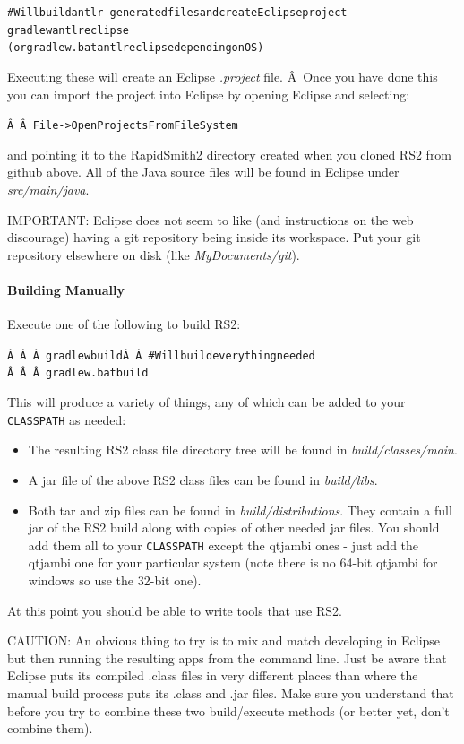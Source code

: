 \documentclass[12pt]{article}
\newcommand{\env}[1]{{\texttt{#1}}}
\newcommand{\fil}[1]{{\em #1}}
\newcommand{\dir}[1]{{\em #1}}
\newenvironment{code}{\begin{center} \begin{minipage}{6in} \noindent \begin{alltt}}{\end{alltt} \end{minipage} \end{center}}
\begin{document}
\vspace{-0.15in}  \begin{code}
# Will build antlr-generated files and create Eclipse project
gradlew antlr eclipse       
(or gradlew.bat antlr eclipse depending on OS)
\end{code} 
Executing these will create an Eclipse \fil{.project} file. Â Once you have done
this you can import the project into Eclipse by opening Eclipse and selecting: 
\vspace{-0.15in}  \begin{code}
Â  Â  File->Open Projects From File System 
\end{code}
and pointing it to the RapidSmith2 directory created when you cloned RS2 from
github above. 
All of the Java source files will be found in Eclipse under \dir{src/main/java}.

IMPORTANT: Eclipse does not seem to like (and instructions on the web
discourage) having a git repository being inside its workspace.  Put your git
repository elsewhere on disk (like \dir{MyDocuments/git}).

\paragraph{Building Manually} 
Execute one of the following to build RS2: 
\vspace{-0.15in}  \begin{code}
Â  Â  Â gradlew build Â  Â  # Will build everything needed
Â  Â  Â gradlew.bat build 
\end{code}
This will produce a variety of things, any of which can be added to your
\env{CLASSPATH} as needed:
\begin{itemize}
  \item The resulting RS2 class file directory tree will be found in
  \dir{build/classes/main}.
  \item	A jar file of the above RS2 class files can be
  found in \dir{build/libs}.
  \item Both tar and zip files can be found in \dir{build/distributions}. They
  contain a full jar of the RS2 build along with copies of other needed jar
  files. You should add them all to your \env{CLASSPATH} except the qtjambi ones
  - just add the qtjambi one for your particular system (note there is no 64-bit
  qtjambi for windows so use the 32-bit one).
\end{itemize}
At this point you should be able to write tools that use RS2.

CAUTION: An obvious thing to try is to mix and match developing in Eclipse but
then running the resulting apps from the command line.  Just be aware that Eclipse
puts its compiled .class files in very different places than where the manual
build process puts its .class and .jar files.  Make sure you understand that
before you try to combine these two build/execute methods (or better yet, don't
combine them).
\end{document}
